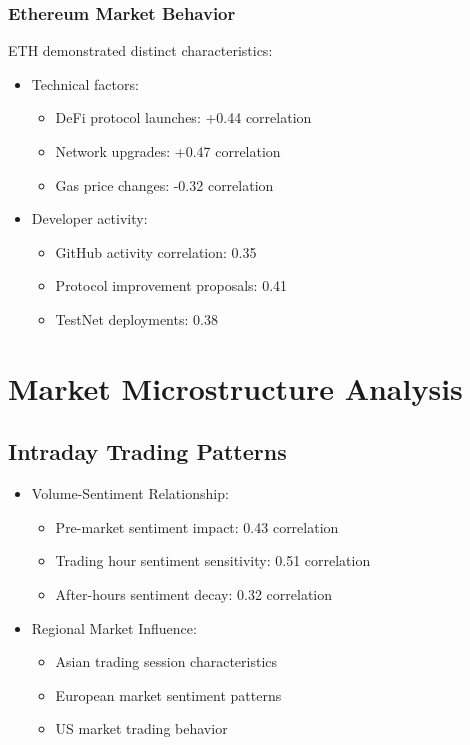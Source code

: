 \documentclass[12pt,a4paper]{report}
\begin{document}
\subsection{Ethereum Market Behavior}
ETH demonstrated distinct characteristics:
\begin{itemize}
    \item Technical factors:
        \begin{itemize}
            \item DeFi protocol launches: +0.44 correlation
            \item Network upgrades: +0.47 correlation
            \item Gas price changes: -0.32 correlation
        \end{itemize}
    \item Developer activity:
        \begin{itemize}
            \item GitHub activity correlation: 0.35
            \item Protocol improvement proposals: 0.41
            \item TestNet deployments: 0.38
        \end{itemize}
\end{itemize}

\chapter{Market Microstructure Analysis}
\section{Intraday Trading Patterns}
\begin{itemize}
    \item Volume-Sentiment Relationship:
        \begin{itemize}
            \item Pre-market sentiment impact: 0.43 correlation
            \item Trading hour sentiment sensitivity: 0.51 correlation
            \item After-hours sentiment decay: 0.32 correlation
        \end{itemize}
    \item Regional Market Influence:
        \begin{itemize}
            \item Asian trading session characteristics
            \item European market sentiment patterns
            \item US market trading behavior
        \end{itemize}
\end{itemize}
\end{document}
